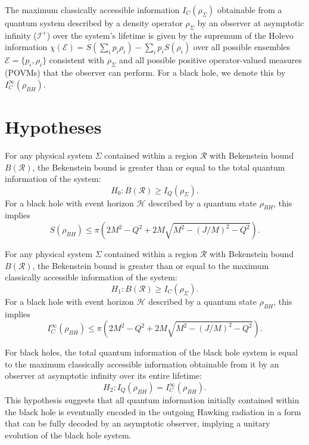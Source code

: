 	\begin{definition}
		The maximum classically accessible information $I_C(\rho_\Sigma)$ obtainable from a quantum system described by a density operator $\rho_\Sigma$ by an observer at asymptotic infinity ($\mathcal{I}^+$) over the system's lifetime is given by the supremum of the Holevo information $\chi(\mathcal{E}) = S(\sum_i p_i \rho_i) - \sum_i p_i S(\rho_i)$ over all possible ensembles $\mathcal{E} = \{p_i, \rho_i\}$ consistent with $\rho_\Sigma$ and all possible positive operator-valued measures (POVMs) that the observer can perform. For a black hole, we denote this by $I_C^{\infty}(\rho_{BH})$.
	\end{definition}
	
	\section{Hypotheses}
	
	\begin{hypothesis}
		For any physical system $\Sigma$ contained within a region $\mathcal{R}$ with Bekenstein bound $B(\mathcal{R})$, the Bekenstein bound is greater than or equal to the total quantum information of the system:
		$$H_0: B(\mathcal{R}) \ge I_Q(\rho_\Sigma).$$
		For a black hole with event horizon $\mathcal{H}$ described by a quantum state $\rho_{BH}$, this implies
		$$S(\rho_{BH}) \le \pi \left( 2 M^2 - Q^2 + 2 M \sqrt{M^2 - (J/M)^2 - Q^2} \right).$$
	\end{hypothesis}
	
	\begin{hypothesis}
		For any physical system $\Sigma$ contained within a region $\mathcal{R}$ with Bekenstein bound $B(\mathcal{R})$, the Bekenstein bound is greater than or equal to the maximum classically accessible information of the system:
		$$H_1: B(\mathcal{R}) \ge I_C(\rho_\Sigma).$$
		For a black hole with event horizon $\mathcal{H}$ described by a quantum state $\rho_{BH}$, this implies
		$$I_C^{\infty}(\rho_{BH}) \le \pi \left( 2 M^2 - Q^2 + 2 M \sqrt{M^2 - (J/M)^2 - Q^2} \right).$$
	\end{hypothesis}
	
	\begin{hypothesis}
		For black holes, the total quantum information of the black hole system is equal to the maximum classically accessible information obtainable from it by an observer at asymptotic infinity over its entire lifetime:
		$$H_2: I_Q(\rho_{BH}) = I_C^{\infty}(\rho_{BH}).$$
		This hypothesis suggests that all quantum information initially contained within the black hole is eventually encoded in the outgoing Hawking radiation in a form that can be fully decoded by an asymptotic observer, implying a unitary evolution of the black hole system.
	\end{hypothesis}
	
